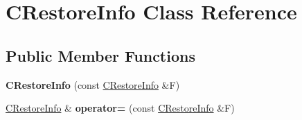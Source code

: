 \hypertarget{class_c_restore_info}{}\section{C\+Restore\+Info Class Reference}
\label{class_c_restore_info}
\subsection*{Public Member Functions}
\begin{DoxyCompactItemize}
\item 
\mbox{\label{class_c_restore_info_a7ccc67be89083d1bdd6c5d7840bbdbce}} 
{\bfseries C\+Restore\+Info} (const \hyperlink{class_c_restore_info}{C\+Restore\+Info} \&F)
\item 
\mbox{\label{class_c_restore_info_abf2d64a4c1baa413958de7445aa5b19c}} 
\hyperlink{class_c_restore_info}{C\+Restore\+Info} \& {\bfseries operator=} (const \hyperlink{class_c_restore_info}{C\+Restore\+Info} \&F)
\end{DoxyCompactItemize}

